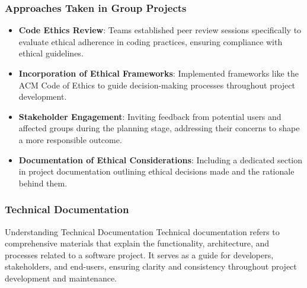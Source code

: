 \documentclass{beamer}
\begin{document}
\begin{frame}[fragile]
    \frametitle{Approaches Taken in Group Projects}
    \begin{itemize}
        \item \textbf{Code Ethics Review}: 
        Teams established peer review sessions specifically to evaluate ethical adherence in coding practices, ensuring compliance with ethical guidelines.

        \item \textbf{Incorporation of Ethical Frameworks}:
        Implemented frameworks like the ACM Code of Ethics to guide decision-making processes throughout project development.

        \item \textbf{Stakeholder Engagement}:
        Inviting feedback from potential users and affected groups during the planning stage, addressing their concerns to shape a more responsible outcome.

        \item \textbf{Documentation of Ethical Considerations}:
        Including a dedicated section in project documentation outlining ethical decisions made and the rationale behind them.
    \end{itemize}
\end{frame}

\begin{frame}[fragile]
    \frametitle{Technical Documentation}
    \begin{block}{Understanding Technical Documentation}
        Technical documentation refers to comprehensive materials that explain the functionality, architecture, and processes related to a software project. It serves as a guide for developers, stakeholders, and end-users, ensuring clarity and consistency throughout project development and maintenance.
    \end{block}
\end{frame}
\end{document}
